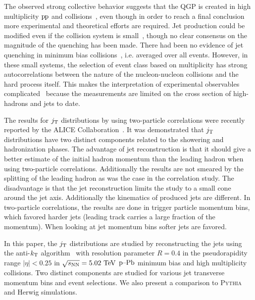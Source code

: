 The observed strong collective behavior suggests that the QGP is created in high multiplicity $\mbox{p\kern-0.05em p}$ and \pA collisions~\cite{Abelev:2012ola,Aad:2012gla,Chatrchyan:2013nka,Khachatryan:2010gv,Khachatryan:2016txc,Aidala:2016vgl}, even though in order to reach a final conclusion more experimental and theoretical efforts are required. Jet production could be modified even if the collision system is small~\cite{Zhang:2013oca,Park:2016jap,TYWONIUK201485}, though no clear consensus on the magnitude of the quenching has been made. There had been no evidence of jet quenching in minimum bias collisions~\cite{Khachatryan:2016odn,ALICEjt}, i.e. averaged over all events.  However, in these small systems, the selection of event class based on multiplicity has strong autocorrelations between the nature of the nucleon-nucleon collisions and the hard process itself. This makes the interpretation of experimental observables complicated~\cite{Adam:2014qja, Adam:2016jfp,Nagle:2018nvi} because the measurements are limited on the cross section of high-\pt{} hadrons and jets to date.

The results for $j_{\rm T}$ distributions by using two-particle correlations were recently reported by the ALICE Collaboration~\cite{ALICEjt}.
It was demonstrated that $j_{\rm T}$ distributions have two distinct components related to the showering and hadronization phases.
The advantage of jet reconstruction is that it should give a better estimate of the initial hadron momentum than the leading hadron when using two-particle correlations. Additionally the results are not smeared by the splitting of the leading hadron as was the case in the correlation study. The disadvantage is that the jet reconstruction limits the study to a small cone around the jet axis. Additionally the kinematics of produced jets are different. In two-particle correlations, the results are done in trigger particle momentum bins, which favored harder jets (leading track carries a large fraction of the momentum). When looking at jet momentum bins softer jets are favored.

In this paper, the $j_{\rm T}$ distributions are studied by reconstructing the jets using the anti-$k_{\rm T}$ algorithm~\cite{antikt} with resolution parameter $R=0.4$ in the pseudorapidity range $|\eta|<0.25$ in $\sqrt{s_{\mathrm{NN}}} = 5.02~\mathrm{TeV}$ $\mbox{p--Pb}$ minimum bias and high multiplicity collisions.
Two distinct components are studied for various jet transverse momentum bins and event selections.
We also present a comparison to \textsc{Pythia} and Herwig simulations.

